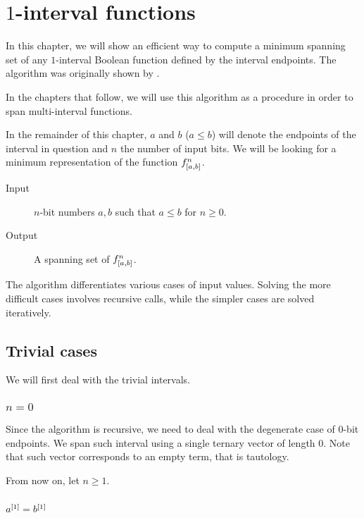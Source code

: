 \chapter{\texorpdfstring{$1$}{1}-interval functions}
\label{chap:1interval}

In this chapter,
we will show an efficient way to compute
a minimum spanning set of any $1$-interval Boolean function
defined by the interval endpoints.
The algorithm was originally shown by
\citet{Schieber2005154}.

In the chapters that follow,
we will use this algorithm as a procedure
in order to span multi-interval functions.

In the remainder of this chapter,
$a$ and $b$ ($a \leq b$) will denote the endpoints
of the interval in question
and $n$ the number of input bits.
We will be looking for a minimum representation
of the function $f^{n}_{[a, b]}$.

\begin{description}
\item[Input] $n$-bit numbers $a, b$ such that $a \leq b$ for $n \geq 0$.
\item[Output] A spanning set of $f^{n}_{[a, b]}$.
\end{description}

The algorithm differentiates various cases
of input values.
Solving the more difficult cases involves recursive calls,
while the simpler cases are solved iteratively.

\section{Trivial cases}

We will first deal with the trivial intervals.

\subsection{\texorpdfstring{$n=0$}{n=0}}

Since the algorithm is recursive,
we need to deal with the degenerate case
of $0$-bit endpoints.
We span such interval using a single ternary vector
of length $0$.
Note that such vector corresponds to an empty term,
that is tautology.

From now on, let $n \geq 1$.

\subsection{\texorpdfstring{$a^{[1]} = b^{[1]}$}{ = }}

